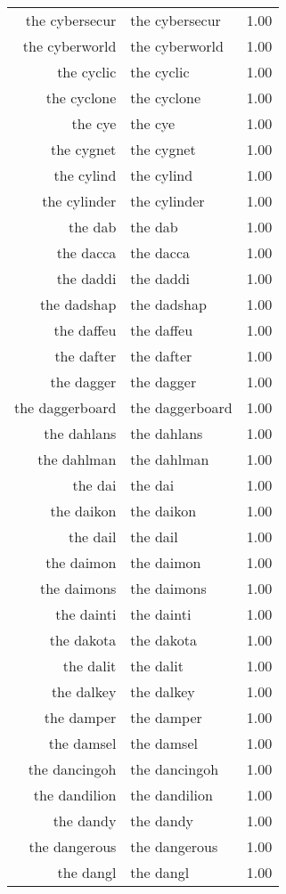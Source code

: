 \begin{table}[ht]
\begin{tabular}{rlr}
  the cybersecur & the cybersecur & 1.00 \\ 
  the cyberworld & the cyberworld & 1.00 \\ 
  the cyclic & the cyclic & 1.00 \\ 
  the cyclone & the cyclone & 1.00 \\ 
  the cye & the cye & 1.00 \\ 
  the cygnet & the cygnet & 1.00 \\ 
  the cylind & the cylind & 1.00 \\ 
  the cylinder & the cylinder & 1.00 \\ 
  the dab & the dab & 1.00 \\ 
  the dacca & the dacca & 1.00 \\ 
  the daddi & the daddi & 1.00 \\ 
  the dadshap & the dadshap & 1.00 \\ 
  the daffeu & the daffeu & 1.00 \\ 
  the dafter & the dafter & 1.00 \\ 
  the dagger & the dagger & 1.00 \\ 
  the daggerboard & the daggerboard & 1.00 \\ 
  the dahlans & the dahlans & 1.00 \\ 
  the dahlman & the dahlman & 1.00 \\ 
  the dai & the dai & 1.00 \\ 
  the daikon & the daikon & 1.00 \\ 
  the dail & the dail & 1.00 \\ 
  the daimon & the daimon & 1.00 \\ 
  the daimons & the daimons & 1.00 \\ 
  the dainti & the dainti & 1.00 \\ 
  the dakota & the dakota & 1.00 \\ 
  the dalit & the dalit & 1.00 \\ 
  the dalkey & the dalkey & 1.00 \\ 
  the damper & the damper & 1.00 \\ 
  the damsel & the damsel & 1.00 \\ 
  the dancingoh & the dancingoh & 1.00 \\ 
  the dandilion & the dandilion & 1.00 \\ 
  the dandy & the dandy & 1.00 \\ 
  the dangerous & the dangerous & 1.00 \\ 
  the dangl & the dangl & 1.00 \\ 

\end{tabular}
\end{table}

